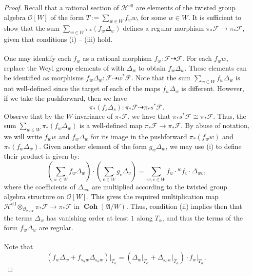 \documentclass[a4paper]{report}
\theoremstyle{theorem}
\theoremstyle{definition}
\theoremstyle{remark}
\theoremstyle{proposition}
\theoremstyle{conjecture}
\theoremstyle{lemma}
\theoremstyle{corollary}
\theoremstyle{exercise}
\theoremstyle{example}
\newcommand{\mcal}{\mathcal}
\newcommand{\on}{\operatorname}
\newcommand{\coh}{\on{\mathbf{Coh}}}
\begin{document}
  \begin{proof}
      Recall that a rational section of $\mcal{H}^{\on{ell}}$ are elements of the twisted 
      group algebra $\mcal{O}[W]$ of the form $T := \sum_{w\in W}f_ww$, for some $w \in W$. 
      It is sufficient to show that the sum $\sum_{w\in W} \pi_\ast(f_w\Delta_w)$ defines a regular morphism 
      $\pi_\ast \mcal{F} \to \pi_\ast\mcal{F}$, given that conditions (i) -- (iii) hold.\\\\
      One may identify each $f_w$ as a rational morphism $f_w : \mcal{F}\dashrightarrow \mcal{F}$. 
      For each $f_ww$, replace the Weyl group elements of with $\Delta_w$ to obtain $f_w\Delta_w$.
      These elements can be identified as morphisms $f_w\Delta_w : \mcal{F} \dashrightarrow w^\ast\mcal{F}$. Note that the sum $\sum_{w\in W} f_w \Delta_w$ 
      is not well-defined since the target of each of the maps $f_w\Delta_w$ is different. However, if 
      we take the pushforward, then we have $$\pi_\ast(f_s\Delta_s) : \pi_\ast\mcal{F} \dashrightarrow \pi_\ast s^\ast\mcal{F}.$$
      Observe that by the $W$-invariance of $\pi_\ast\mcal{F}$, we have that $\pi_\ast s^\ast \mcal{F} \cong \pi_\ast\mcal{F}$.
      Thus, the sum $\sum_{w\in W} \pi_\ast(f_w \Delta_w)$ is a well-defined map $\pi_\ast\mcal{F} \to \pi_\ast\mcal{F}$.
      By abuse of notation, we will write $f_ww$ and $f_w\Delta_w$ for its image in the pushforward $\pi_\ast(f_ww)$ and $\pi_\ast(f_w\Delta_w)$.
      Given another element of the form $g_w \Delta_w$, we may use (i) to define their product is given by: 
      $$\left(\sum_{w \in W} f_w \Delta_w \right)\cdot \left(\sum_{v\in W} g_v \Delta_v\right) = \sum_{w,v\in W} f_w \cdot {}^wf_v \cdot \Delta_{wv},$$
      where the coefficients of $\Delta_{wv}$ are multiplied according to the twisted group algebra structure on 
      $\mcal{O}[W]$. This gives the required multiplication map $\mcal{H}^{\on{ell}} \otimes_{\mcal{O}_{\mathfrak{A}/W}} \pi_\ast\mcal{F} \to \pi_\ast\mcal{F}$ 
      in $\coh(\mathfrak{A}/W)$.
      Thus, condition (ii) implies then that the terms $\Delta_w$ has vanishing order at least $1$ along 
      $T_\alpha$, and thus the terms of the form $f_w\Delta_w$ are regular. \\\\
      Note that 
      \begin{equation}\label{eqn_thingg}
          \left(f_w\Delta_w + f_{s_\alpha w}\Delta_{s_\alpha w}\right)\vert_{T_\alpha} = \left(\Delta_w\vert_{T_\alpha} + \Delta_{s_\alpha w}\vert_{T_\alpha}\right)\cdot f_w\vert_{T_\alpha},

\end{equation}
\end{proof}
\end{document}
